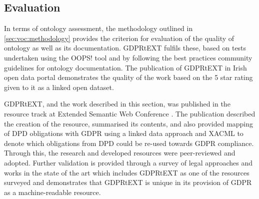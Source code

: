 \subsection{Evaluation}
In terms of ontology assessment, the methodology outlined in \autoref{sec:voc:methodology} provides the criterion for evaluation of the quality of ontology as well as its documentation. GDPRtEXT fulfils these, based on tests undertaken using the OOPS! tool and by following the best practices community guidelines for ontology documentation.
The publication of GDPRtEXT in Irish open data portal demonstrates the quality of the work based on the 5 star rating given to it as a linked open dataset.

GDPRtEXT, and the work described in this section, was published in the resource track at Extended Semantic Web Conference \cite{pandit_gdprtext_2018}. The publication described the creation of the resource, summarised its contents, and also provided mapping of DPD obligations with GDPR using a linked data approach and XACML to denote which obligations from DPD could be re-used towards GDPR compliance. Through this, the research and developed resources were peer-reviewed and adopted.
Further validation is provided through a survey of legal approaches and works in the state of the art \cite{leone_taking_2019} which includes GDPRtEXT as one of the resources surveyed and demonstrates that GDPRtEXT is unique in its provision of GDPR as a machine-readable resource.

